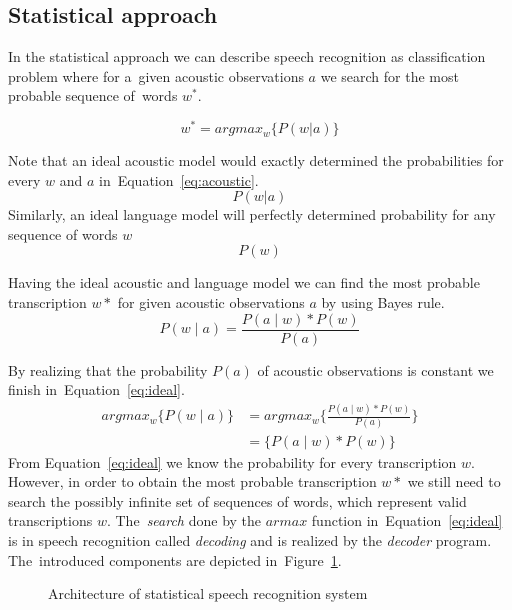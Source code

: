 \subsection*{Statistical approach}
\label{sub:statistical_approach}
In the statistical approach we can describe speech recognition as classification problem where 
for a~given acoustic observations $a$ we search for the most probable sequence of~words $w^*$.

\begin{equation}\label{eq:asr}
    w^* = argmax_{w}\{P(w|a)\} 
\end{equation}

Note that an ideal acoustic model would exactly determined the probabilities for every $w$ and $a$ in~Equation~\ref{eq:acoustic}.
\begin{equation}\label{eq:acoustic}
    P(w|a)
\end{equation}
Similarly, an ideal language model will perfectly determined probability for any sequence of words $w$
\begin{equation}
    P(w)
\end{equation}

Having the ideal acoustic and language model we can find the most probable transcription $w*$ for given acoustic observations $a$ by using Bayes rule.
\begin{equation}
    P(w \mid a) = \frac{P(a \mid w) * P(w)}{P(a)}
\end{equation}

By realizing that the probability $P(a)$ of acoustic observations is constant we finish in~Equation~\ref{eq:ideal}.
\begin{align}\label{eq:ideal}
    argmax_w\{P(w \mid a)\} &= argmax_w \{\frac{P(a \mid w) * P(w)}{P(a)}\}\\
                            &= \{P(a \mid w) * P(w)\}
\end{align}
From Equation~\ref{eq:ideal} we know the probability for every transcription $w$. However, in order to obtain the most probable transcription $w*$ we still need to search the possibly infinite set of sequences of words, which represent valid transcriptions $w$. The~{\it search}\/ done by the $armax$ function in~Equation~\ref{eq:ideal} is in speech recognition called {\it decoding}\/ and is realized by the {\it decoder}\/ program. The~introduced components are depicted in~Figure~\ref{fig:components}.
\begin{figure}[!htp]
    \begin{center}
    
    \caption{Architecture of statistical speech recognition system\cite{ney1990acoustic}}
    \label{fig:components} 
    \end{center}
\end{figure}



